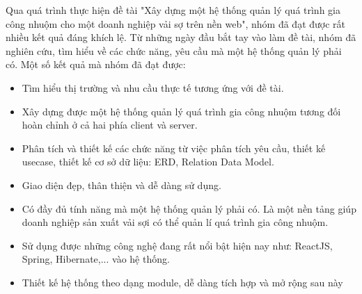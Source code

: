 Qua quá trình thực hiện đề tài "Xây dựng một hệ thống quản lý quá trình gia công nhuộm cho một doanh nghiệp vải sợ trên nền web", nhóm đã đạt được rất nhiều kết quả đáng khích lệ. Từ những ngày đầu bắt tay vào làm đề tài, nhóm đã nghiên cứu, tìm hiểu về các chức năng, yêu cầu mà một hệ thống quản lý phải có. Một số kết quả mà nhóm đã đạt được:

\begin{itemize}
    \item Tìm hiểu thị trường và nhu cầu thực tế tương ứng với đề tài.
    \item Xây dựng được một hệ thống quản lý quá trình gia công nhuộm tương đối hoàn chỉnh ở cả hai phía client và server.
    \item Phân tích và thiết kế các chức năng từ việc phân tích yêu cầu, thiết kế usecase, thiết kế cơ sở dữ liệu: ERD, Relation Data Model.
    \item Giao diện đẹp, thân thiện và dễ dàng sử dụng.
    \item Có đầy đủ tính năng mà một hệ thống  quản lý phải có. Là một nền tảng giúp doanh nghiệp sản xuất vải sợi có thể quản lí quá trình gia công nhuộm.
    \item Sử dụng được những công nghệ đang rất nổi bật hiện nay như: ReactJS, Spring, Hibernate,... vào hệ thống.
    \item Thiết kế hệ thống theo dạng module, dễ dàng tích hợp và mở rộng sau này
\end{itemize}